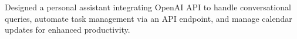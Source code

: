   {Designed a personal assistant integrating OpenAI API to handle conversational queries, automate task management via an API endpoint, and manage calendar updates for enhanced productivity.}
